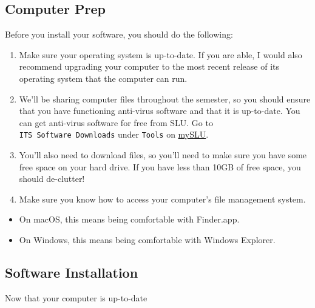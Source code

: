 \documentclass[]{book}
\providecommand{\tightlist}{%
  \setlength{\itemsep}{0pt}\setlength{\parskip}{0pt}}
\theoremstyle{definition}
\theoremstyle{definition}
\theoremstyle{definition}
\theoremstyle{remark}
\begin{document}
\subsection{Computer Prep}\label{computer-prep}

Before you install your software, you should do the following:

\begin{enumerate}
\def\labelenumi{\arabic{enumi}.}
\item
  Make sure your operating system is up-to-date. If you are able, I
  would also recommend upgrading your computer to the most recent
  release of its operating system that the computer can run.
\item
  We'll be sharing computer files throughout the semester, so you should
  ensure that you have functioning anti-virus software and that it is
  up-to-date. You can get anti-virus software for free from SLU. Go to
  \texttt{ITS\ Software\ Downloads} under \texttt{Tools} on
  \href{https://myslu.slu.edu/tools}{mySLU}.
\item
  You'll also need to download files, so you'll need to make sure you
  have some free space on your hard drive. If you have less than 10GB of
  free space, you should de-clutter!
\item
  Make sure you know how to access your computer's file management
  system.
\end{enumerate}

\begin{itemize}
\tightlist
\item
  On macOS, this means being comfortable with Finder.app.
\item
  On Windows, this means being comfortable with Windows Explorer.
\end{itemize}

\subsection{Software Installation}\label{software-installation}

Now that your computer is up-to-date
\end{document}
